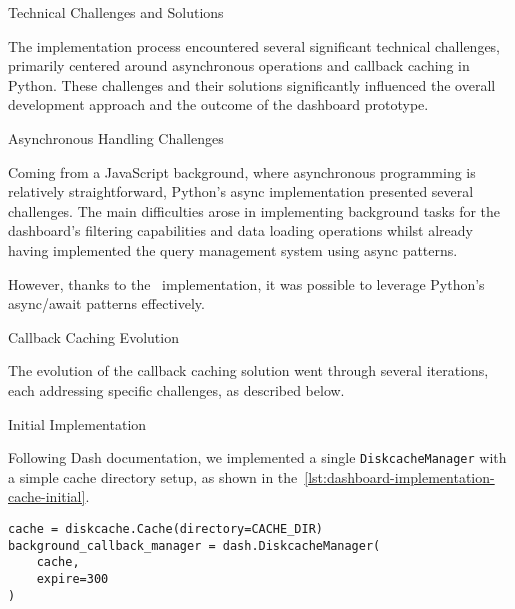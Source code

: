 \begin{section}{Technical Challenges and Solutions}
	\label{sec:implementation-technical-challenges}

	The implementation process encountered several significant technical challenges, primarily centered around asynchronous operations and callback caching in Python.
	These challenges and their solutions significantly influenced the overall development approach and the outcome of the dashboard prototype.

	\begin{subsection}{Asynchronous Handling Challenges}
		\label{subsec:implementation-technical-challenges-async}

		Coming from a JavaScript background, where asynchronous programming is relatively straightforward\cite{node.js_asynchronous_work_javascript_asynchronous_programming_and_callbacks}, Python's async implementation presented several challenges.
		The main difficulties arose in implementing background tasks for the dashboard's filtering capabilities and data loading operations whilst already having implemented the query management system using async patterns.

		However, thanks to the~ implementation, it was possible to leverage Python's async/await patterns effectively.
	\end{subsection}

	\begin{subsection}{Callback Caching Evolution}
		\label{subsec:implementation-technical-challenges-caching}

		The evolution of the callback caching solution went through several iterations, each addressing specific challenges, as described below.

		\begin{subsubsection}{Initial Implementation}
			\label{subsubsec:implementation-technical-challenges-caching-initial}

			Following Dash documentation\cite{plotly_dash_plotly_com_background_callbacks}, we implemented a single \texttt{DiskcacheManager} with a simple cache directory setup,
			as shown in the~\autoref{lst:dashboard-implementation-cache-initial}.

			\begin{listing}[H]
				\caption{Initial Cache Manager Setup}
				\begin{verbatim}
cache = diskcache.Cache(directory=CACHE_DIR)
background_callback_manager = dash.DiskcacheManager(
    cache,
    expire=300
)
				\end{verbatim}
				\label{lst:dashboard-implementation-cache-initial}
			\end{listing}


\end{subsubsection}
\end{subsection}
\end{section}
